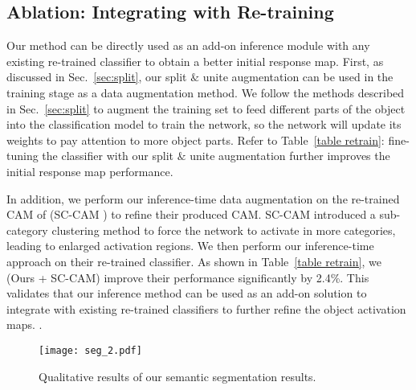 \documentclass[10pt,twocolumn,letterpaper]{article}
\begin{document}
\subsection{Ablation: Integrating with Re-training}
\label{sec ablation re-train}
Our method can be directly used as an add-on inference module with any existing re-trained classifier to obtain a better initial response map.
First, as discussed in Sec.~\ref{sec:split},
our split $\&$ unite augmentation can be used in the training stage as a
data augmentation method. We follow the methods described in Sec.~\ref{sec:split} to augment the training set to
feed different parts of the object into the classification model to train the network, so the network will update its weights to pay attention to more object parts.
Refer to Table~\ref{table retrain}: fine-tuning the classifier with our split $\&$ unite augmentation further improves the initial response map performance.



In addition, we perform our inference-time data augmentation on the re-trained CAM of (SC-CAM \cite{chang2020weakly}) to refine their produced CAM. SC-CAM \cite{chang2020weakly} introduced a sub-category clustering method to force the network to activate in more categories, leading to enlarged activation regions. We then perform our inference-time approach on their
re-trained classifier.
As shown in Table~\ref{table retrain},
we (Ours + SC-CAM) improve their performance significantly by 2.4\%.
This validates that our inference method can be used as an add-on solution to integrate with existing re-trained classifiers to further refine the object activation maps.
.










\begin{figure}[t!]
   \begin{center}
   {\texttt{[image: seg\_2.pdf]}}
   \end{center}
\vspace{-2mm}
\caption{Qualitative results of our semantic segmentation results.}
\vspace{-2mm}
   \label{fig: seg}
\end{figure}
\end{document}

